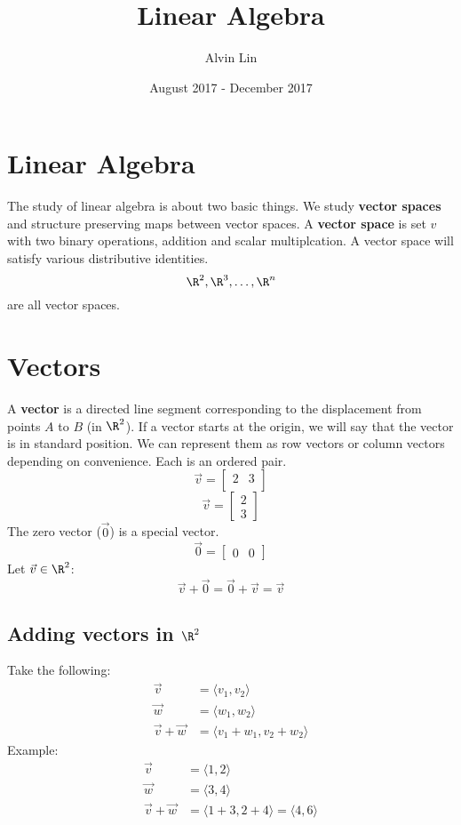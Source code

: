 \documentclass[letterpaper, 12pt]{math}
\title{Linear Algebra}
\author{Alvin Lin}
\date{August 2017 - December 2017}
\begin{document}
\maketitle

\section*{Linear Algebra}
The study of linear algebra is about two basic things. We study
\textbf{vector spaces} and structure preserving maps between vector
spaces. A \textbf{vector space} is set \( v \) with two binary operations,
addition and scalar multiplcation. A vector space will satisfy various
distributive identities.
\[ \R^2, \R^3, \dots, \R^n \]
are all vector spaces.

\section*{Vectors}
A \textbf{vector} is a directed line segment corresponding to the displacement
from points \( A \) to \( B \) (in \( \R^2 \)). If a vector starts at the
origin, we will say that the vector is in standard position. We can represent
them as row vectors or column vectors depending on convenience. Each is an
ordered pair.
\[ \vec{v} =
  \begin{bmatrix}
    2 & 3 \\
  \end{bmatrix} \]
\[ \vec{v} =
  \begin{bmatrix}
    2 \\
    3
  \end{bmatrix}
\]
The zero vector (\( \vec{0} \)) is a special vector.
\[ \vec{0} =
  \begin{bmatrix}
    0 & 0
  \end{bmatrix}
\]
Let \( \vec{v}\in\R^2 \):
\[ \vec{v}+\vec{0}=\vec{0}+\vec{v}=\vec{v} \]

\subsection*{Adding vectors in \( \R^2 \)}
Take the following:
\begin{align*}
  \vec{v} &= \langle v_{1},v_{2}\rangle \\
  \vec{w} &= \langle w_{1},w_{2}\rangle \\
  \vec{v}+\vec{w} &= \langle v_{1}+w_{1},v_{2}+w_{2}\rangle
\end{align*}
Example:
\begin{align*}
  \vec{v} &= \langle1,2\rangle \\
  \vec{w} &= \langle3,4\rangle \\
  \vec{v}+\vec{w} &= \langle1+3,2+4\rangle = \langle4,6\rangle
\end{align*}
\end{document}
